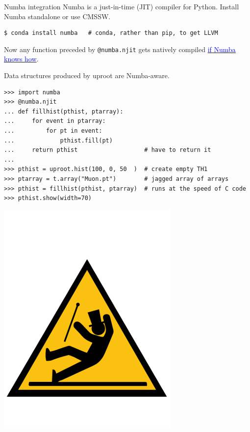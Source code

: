\documentclass[aspectratio=169]{beamer}
\begin{document}
\begin{frame}[fragile]{Numba integration}
\vspace{0.25 cm}
\small
Numba is a just-in-time (JIT) compiler for Python. Install Numba standalone or use CMSSW.

\begin{verbatim}
$ conda install numba   # conda, rather than pip, to get LLVM
\end{verbatim}

\vspace{0.25 cm}
Now any function preceded by {\tt @numba.njit} gets natively compiled \href{http://numba.pydata.org/numba-doc/dev/reference/pysupported.html}{\textcolor{blue}{if Numba knows how}}.

Data structures produced by uproot are Numba-aware.

\begin{verbatim}
>>> import numba
>>> @numba.njit
... def fillhist(pthist, ptarray):
...     for event in ptarray:
...         for pt in event:
...             pthist.fill(pt)
...     return pthist                   # have to return it
... 
>>> pthist = uproot.hist(100, 0, 50  )  # create empty TH1
>>> ptarray = t.array("Muon.pt")        # jagged array of arrays
>>> pthist = fillhist(pthist, ptarray)  # runs at the speed of C code
>>> pthist.show(width=70)
\end{verbatim}

\vspace{-5 cm}
\hfill \includegraphics[width=1.5 cm]{caution.png}\hspace{-0.9 cm}
\vspace{5 cm}
\end{frame}
\end{document}
